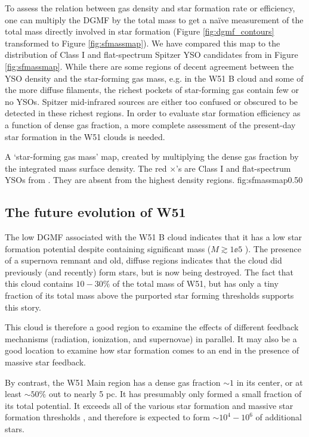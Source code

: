 To assess the relation between gas density and star formation rate or
efficiency, one can multiply the DGMF by the total mass to get a naïve
measurement of the total mass directly involved in star formation (Figure
\ref{fig:dgmf_contours} transformed to Figure \ref{fig:sfmassmap}).  We have
compared this map to the distribution of Class I and flat-spectrum Spitzer YSO
candidates from \citet{Kang2009a} in Figure \ref{fig:sfmassmap}.  While there
are some regions of decent agreement between the YSO density and the
star-forming gas mass, e.g.  in the W51 B cloud and some of the more diffuse
filaments, the richest pockets of star-forming gas contain few or no YSOs.
Spitzer mid-infrared sources are either too confused or obscured to be detected
in these richest regions.  In order to evaluate star formation efficiency as a
function of dense gas fraction, a more complete assessment of the present-day
star formation in the W51 clouds is needed.

{A `star-forming gas mass' map, created by multiplying the dense gas fraction
by the integrated \thirteenco mass surface density.  The red $\times$'s are
Class I and flat-spectrum YSOs from \citet{Kang2009a}.  They are absent from
the highest density regions.
}
{fig:sfmassmap}{0.5}{0}

\subsection{The future evolution of W51}
\label{sec:futureev}
The low DGMF associated with the W51 B cloud indicates that it has a
low star formation potential despite containing significant mass
($M\gtrsim1\ee{5}$ \msun).  The presence of a supernova remnant and old,
diffuse \hii regions indicates that the cloud did previously (and recently) form
stars, but is now being destroyed.  The fact that this cloud contains $10-30\%$
of the total mass of W51, but has only a tiny fraction of its total mass above
the purported star forming thresholds supports this story.

This cloud is therefore a good region to examine the effects of different
feedback mechanisms (radiation, ionization, and supernovae) in parallel.  It
may also be a good location to examine how star formation comes to an end in
the presence of massive star feedback.

By contrast, the W51 Main region has a dense gas fraction $\sim1$ in its
center, or at least $\sim50\%$ out to nearly 5 pc.  It has presumably only
formed a small fraction
of its total potential.  It exceeds all of the various star formation and
massive star formation thresholds
\citep[e.g.][]{Lada2010a,Krumholz2008a,Kauffmann2010a}, and therefore is expected
to form $\sim10^4-10^6$ \msun of additional stars.

